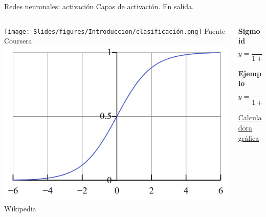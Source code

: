 \begin{frame}{Redes neuronales: activación}
Capas de activación. En salida.
\newline

\begin{columns}[c]
\centering
\begin{column}{0.4\textwidth}
    \centering
    \texttt{[image: Slides/figures/Introduccion/clasificación.png]}
    \scriptsize{Fuente Coursera}
    \includegraphics[width=\textwidth]{Slides/figures/Introduccion/sigmoid_graph.png}
    \scriptsize{Wikipedia}
\end{column}
\begin{column}{0.4\textwidth}
    \centering

    \textbf{Sigmoid}
    \begin{equation}
     y = \frac{1}{1 + e^{-z}}
    \end{equation}
    
    \vspace{0.5cm}
    
    \textbf{Ejemplo}
    \begin{equation}
     y = \frac{1}{1 + e^{-(3*x-2)}}
    \end{equation}

    \vspace{0.5cm}
    
    \href{https://www.desmos.com/calculator/ctrsgcjd8n}{Calculadora gráfica}
\end{column}
\end{columns}

\end{frame}

